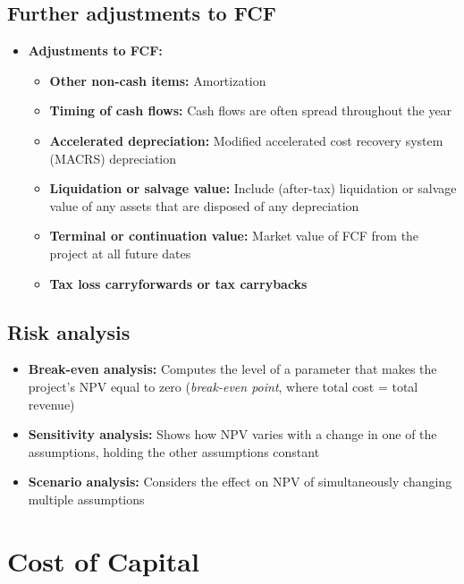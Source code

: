 \documentclass[ieeetran]{article}
\begin{document}
\subsection{Further adjustments to FCF} %
\label{sub:further_adjustments_to_fCF}
\begin{itemize}
  \item \textbf{Adjustments to FCF:}
	  \begin{itemize}
	    \item \textbf{Other non-cash items:} Amortization
	\item \textbf{Timing of cash flows:} Cash flows are often spread throughout the year
		\item \textbf{Accelerated depreciation:} Modified accelerated cost recovery system (MACRS) depreciation

		\item \textbf{Liquidation or salvage value:} Include (after-tax) liquidation or salvage value of any assets that are disposed of any depreciation
		\item \textbf{Terminal or continuation value:} Market value of FCF from the project at all future dates
		\item \textbf{Tax loss carryforwards or tax carrybacks}
	  \end{itemize}
\end{itemize}

\subsection{Risk analysis} %
\label{sub:risk_analysis}
\begin{itemize}
  \item \textbf{Break-even analysis:} Computes the level of a parameter that makes the project's NPV equal to zero (\textit{break-even point}, where total cost = total revenue)
\item \textbf{Sensitivity analysis:} Shows how NPV varies with a change in one of the assumptions, holding the other assumptions constant
\item \textbf{Scenario analysis:} Considers the effect on NPV of simultaneously changing multiple assumptions
\end{itemize}

\section{Cost of Capital} %
\label{sec:cost_of_capital}
\end{document}
